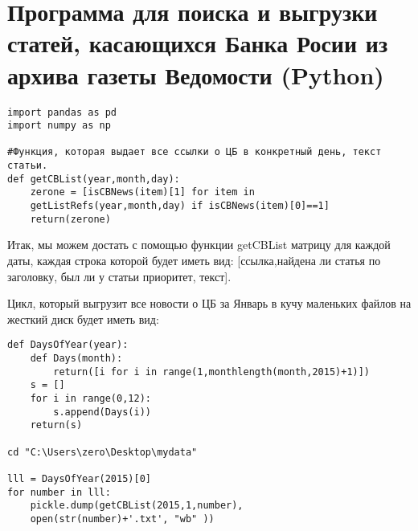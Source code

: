 
\newpage

\appendix
\renewcommand{\thechapter}{\Asbuk{chapter}}


%


\chapter[Программа~~  для~~ поиска~~ и~~ выгрузки~~   статей, касающихся Банка России из архива газеты Ведомости]{Программа для поиска и выгрузки статей, касающихся Банка Росии из архива газеты Ведомости (Python)}\label{app-a}

\begin{verbatim}
import pandas as pd
import numpy as np

#Функция, которая выдает все ссылки о ЦБ в конкретный день, текст статьи.
def getCBList(year,month,day):
    zerone = [isCBNews(item)[1] for item in 
    getListRefs(year,month,day) if isCBNews(item)[0]==1]
    return(zerone)
\end{verbatim}

Итак, мы можем достать с помощью функции getCBList матрицу для каждой даты, каждая строка которой будет иметь вид: [ссылка,найдена ли статья по заголовку, был ли у статьи приоритет, текст].

Цикл, который выгрузит все новости о ЦБ за Январь в кучу маленьких файлов на жесткий диск будет иметь вид:

\begin{verbatim}
def DaysOfYear(year):
    def Days(month):
        return([i for i in range(1,monthlength(month,2015)+1)])
    s = []
    for i in range(0,12):
        s.append(Days(i))
    return(s)
    
cd "C:\Users\zero\Desktop\mydata"

lll = DaysOfYear(2015)[0]
for number in lll:
    pickle.dump(getCBList(2015,1,number), 
    open(str(number)+'.txt', "wb" )) 
\end{verbatim}

